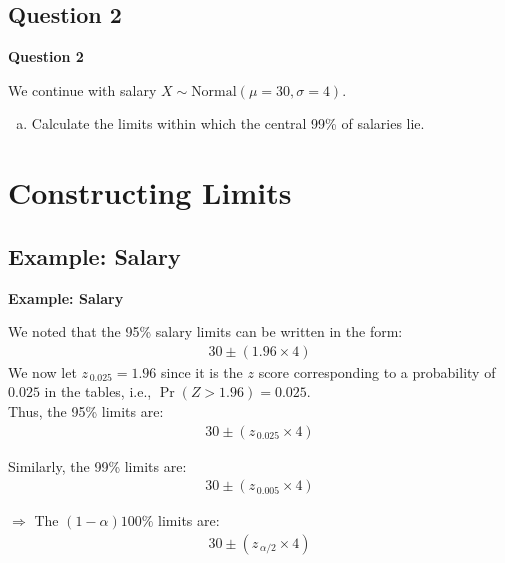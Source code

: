 \documentclass[compress]{beamer}        %
\makeatletter
\newcommand{\tcb}{\textcolor{beamer@blendedblue}}
\makeatother
\begin{document}
\subsection{Question 2}
\begin{frame}{\bf \tcb{Question 2}}

We continue with salary $X \sim \text{Normal}(\mu=30,\sigma=4)$.\\[0.2cm]

\begin{enumerate}[a)]
\item Calculate the limits within which the central 99\% of salaries lie.
\end{enumerate}


\end{frame}


\section{Constructing Limits}
\subsection{Example: Salary}
\begin{frame}{\bf \tcb{Example: Salary}}

We noted that the 95\% salary limits can be written in the form:
\begin{align*}
30 \pm (1.96\times4)
\end{align*}
We now let $z_{\,0.025} = 1.96$ since it is the $z$ score corresponding to a probability of $0.025$ in the tables, i.e., $\Pr(Z > 1.96) = 0.025$.\\[0.3cm]
Thus, the 95\% limits are:\\[-0.7cm]
\begin{align*}
30\pm (z_{\,0.025}\times4)
\end{align*}

Similarly, the 99\% limits are:\\[-0.7cm]
\begin{align*}
30\pm (z_{\,0.005}\times4)
\end{align*}

$\Rightarrow$ The $(1-\alpha)100\%$ limits are:\\[-0.7cm]
\begin{align*}
30\pm (z_{\,\alpha/2}\times4)
\end{align*}

\end{frame}
\end{document}
